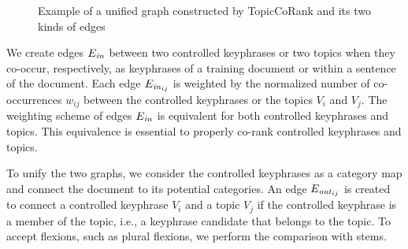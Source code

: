 \begin{figure*}
      \caption{Example of a unified graph constructed by TopicCoRank and its two
               kinds of edges
               \label{fig:topicrankpp_graph}}
    \end{figure*}

    We create edges $E_\textnormal{\textit{in}}$ between two controlled
    keyphrases or two topics when they co-occur, respectively, as keyphrases of
    a training document or within a sentence of the
    document. Each edge $E_{\textnormal{\textit{in}}_{ij}}$ is weighted by
    the normalized number of co-occurrences $w_{ij}$ between the controlled
    keyphrases or the topics $V_i$ and $V_j$. The weighting scheme of edges
    $E_\textnormal{\textit{in}}$ is equivalent for both controlled keyphrases and
    topics. This equivalence is essential to properly co-rank controlled keyphrases
    and topics.

    To unify the two graphs, we consider the controlled keyphrases as a category map and connect the document to its potential categories. An edge
    $E_{\textnormal{\textit{out}}_{ij}}$ is created to connect a controlled
    keyphrase $V_i$ and a topic $V_j$ if the controlled keyphrase is a
    member of the topic, i.e., a keyphrase candidate that belongs to the topic.
    To accept flexions, such as plural flexions, we perform the comparison with
    stems.

